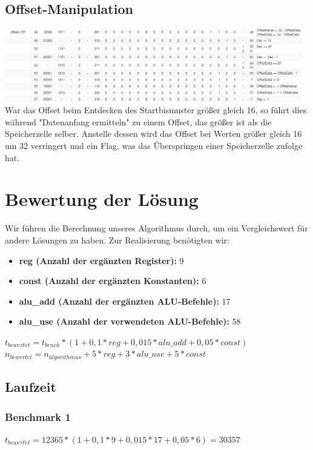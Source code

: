 \documentclass[12pt,titlepage,german,a4]{article}
\begin{document}
    \subsection{Offset-Manipulation}
	\includegraphics[width=13cm]{img/k6.png} \\
    War das Offset beim Entdecken des Startbismuster gr{\"o}{\ss}er gleich 16, so f{\"u}hrt dies w{\"a}hrend "Datenanfang ermitteln" zu einem Offset, das gr{\"o}{\ss}er ist als die Speicherzelle selber. Anstelle dessen wird das Offset bei Werten gr{\"o}{\ss}er gleich 16 um 32 verringert und ein Flag, was das {\"U}berspringen einer Speicherzelle zufolge hat.

    \newpage

    \section{Bewertung der L{\"o}sung}
    Wir f{\"u}hren die Berechnung unseres Algorithmus durch, um ein Vergleichswert f{\"u}r andere L{\"o}sungen zu haben. Zur Realisierung ben{\"o}tigten wir:
    \begin{itemize}
        \item \textbf{reg (Anzahl der erg{\"a}nzten Register):} 9
        \item \textbf{const (Anzahl der erg{\"a}nzten Konstanten):} 6
        \item \textbf{alu{\_}add (Anzahl der erg{\"a}nzten ALU-Befehle):} 17
        \item \textbf{alu{\_}use (Anzahl der verwendeten ALU-Befehle):} 58
    \end{itemize}
	$t_{bewertet} = t_{bench} * (1 + 0,1*reg + 0,015*alu{\_}add + 0,05*const)$ \\
	$n_{bewertet} = n_{algorithmus} + 5* reg + 3*alu{\_}use + 5* const$ \\

    \subsection{Laufzeit}

    \subsubsection{Benchmark 1}
    $t_{bewertet} = 12365 * (1 + 0,1*9 + 0,015*17 + 0,05*6) = 30357$
\end{document}
